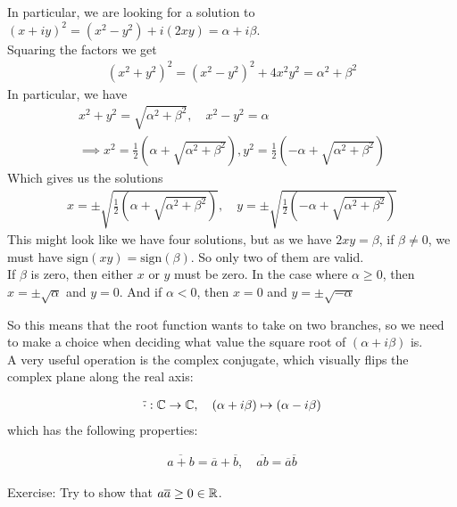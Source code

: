 In particular, we are looking for a solution to $(x + iy)^2 = (x^2 - y^2) + i(2 xy) = \alpha + i \beta$.\\
Squaring the factors we get
\begin{align*}
				(x^2 + y^2)^2 = (x^2 - y^2)^2 + 4x^2y^2 = \alpha^2 + \beta^2
\end{align*}
In particular, we have 
\begin{align*}
				x^2 + y^2 = \sqrt{ \alpha^2 + \beta^2}, \quad x^2 - y^2 = \alpha\\
				\implies x^2 = \frac{1}{2} \left( \alpha + \sqrt{ \alpha^2 + \beta^2}\right), y^2 = \frac{1}{2} \left(- \alpha + \sqrt{ \alpha^2 + \beta^2}\right)
\end{align*}
Which gives us the solutions
\begin{align*}
				x = \pm \sqrt{ \frac{1}{2} \left( \alpha + \sqrt{ \alpha^2 + \beta^2}\right)}, \quad y = \pm \sqrt{ \frac{1}{2} \left(- \alpha + \sqrt{ \alpha^2 + \beta^2}\right)}
\end{align*}
This might look like we have four solutions, but as we have $2xy = \beta$, if $ \beta \neq 0$, we must have $\text{sign}(xy) = \text{sign}( \beta)$. So only two of them are valid.\\
If $ \beta$ is zero, then either $x$ or $y$ must be zero.
In the case where $ \alpha \geq 0$, then $x = \pm \sqrt{ \alpha}$ and $y = 0$. And if $ \alpha < 0$, then $x = 0$ and $y = \pm \sqrt{- \alpha}$

So this means that the root function wants to take on two branches, so we need to make a choice when deciding what value the square root of $( \alpha + i \beta)$ is.\\

A very useful operation is the complex conjugate, which visually flips the complex plane along the real axis:

\begin{align*}
				\overline{ \cdot}: \mathbb{C} \to \mathbb{C}, \quad ( \alpha + i \beta) \mapsto (\alpha - i \beta)
\end{align*}
which has the following properties:

\begin{align*}
				\overline{a + b} = \overline{a} + \overline{b}, \quad \overline{ab} = \overline{a} \overline{b}
\end{align*}

Exercise: Try to show that $a \overline{a} \geq 0 \in \mathbb{R}$.
